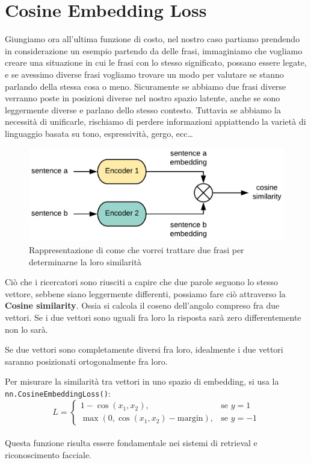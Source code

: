 \section{Cosine Embedding Loss}
Giungiamo ora all'ultima funzione di costo, nel nostro caso partiamo prendendo in considerazione un esempio partendo da delle frasi, immaginiamo che vogliamo creare una situazione in cui le frasi con lo stesso significato, possano essere legate, e se avessimo diverse frasi vogliamo trovare un modo per valutare se stanno parlando della stessa cosa o meno. Sicuramente se abbiamo due frasi diverse verranno poste in posizioni diverse nel nostro spazio latente, anche se sono leggermente diverse e parlano dello stesso contesto. Tuttavia se abbiamo la necessità di unificarle, rischiamo di perdere informazioni appiattendo la varietà di linguaggio basata su tono, espressività, gergo, ecc\dots
\begin{figure}[h]
    \centering
    \includegraphics[width=0.75\linewidth]{figure/CosineSim.png}
    \caption{Rappresentazione di come che vorrei trattare due frasi per determinarne la loro similarità}
    \label{fig:coSim}
\end{figure}
Ciò che i ricercatori sono riusciti a capire che due parole seguono lo stesso vettore, sebbene siano leggermente differenti, possiamo fare ciò attraverso la \textbf{Cosine similarity}. Ossia si calcola il coseno dell'angolo compreso fra due vettori. Se i due vettori sono uguali fra loro la risposta sarà zero differentemente non lo sarà.
\begin{Osservazione}
    Se due vettori sono completamente diversi fra loro, idealmente i due vettori saranno posizionati ortogonalmente fra loro.
\end{Osservazione}
    
Per misurare la similarità tra vettori in uno spazio di embedding, si usa la \texttt{nn.CosineEmbeddingLoss()}:
\begin{equation}
L = \begin{cases} 
1 - \cos(x_1, x_2), & \text{se } y = 1 \\
\max(0, \cos(x_1, x_2) - \text{margin}), & \text{se } y = -1
\end{cases}
\end{equation}
\\
Questa funzione risulta essere fondamentale nei sistemi di retrieval e riconoscimento facciale.